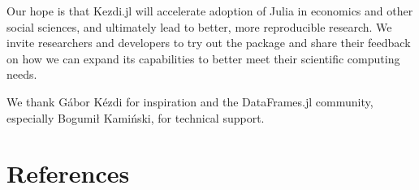 \documentclass{juliacon}
\begin{document}
Our hope is that Kezdi.jl will accelerate adoption of Julia in economics and other social sciences, and ultimately lead to better, more reproducible research. We invite researchers and developers to try out the package and share their feedback on how we can expand its capabilities to better meet their scientific computing needs.

\backmatter


We thank Gábor Kézdi for inspiration and the DataFrames.jl community, especially Bogumił Kamiński, for technical support.

\section*{References}
\begingroup
\setlength{\parindent}{0pt}
\setlength{\parskip}{2pt}
\def\small{\small}




\endgroup
\end{document}
